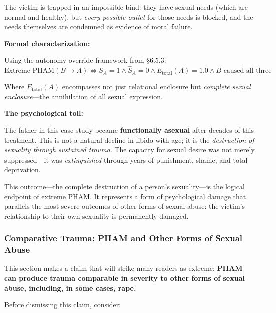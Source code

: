 \documentclass[12pt, letterpaper]{article}
\begin{document}
The victim is trapped in an impossible bind: they have sexual needs (which are normal and healthy), but \textit{every possible outlet} for those needs is blocked, and the needs themselves are condemned as evidence of moral failure.

\textbf{Formal characterization:}

Using the autonomy override framework from \S 6.5.3:
\[
\text{Extreme-PHAM}(B \rightarrow A) \iff S_A = 1 \land \hat{S}_A = 0 \land E_{\text{total}}(A) = 1.0 \land B \text{ caused all three}
\]

Where $E_{\text{total}}(A)$ encompasses not just relational enclosure but \textit{complete sexual enclosure}---the annihilation of all sexual expression.

\textbf{The psychological toll:}

The father in this case study became \textbf{functionally asexual} after decades of this treatment. This is not a natural decline in libido with age; it is the \textit{destruction of sexuality through sustained trauma}. The capacity for sexual desire was not merely suppressed---it was \textit{extinguished} through years of punishment, shame, and total deprivation.

This outcome---the complete destruction of a person's sexuality---is the logical endpoint of extreme PHAM. It represents a form of psychological damage that parallels the most severe outcomes of other forms of sexual abuse: the victim's relationship to their own sexuality is permanently damaged.

\subsubsection{Comparative Trauma: PHAM and Other Forms of Sexual Abuse}

This section makes a claim that will strike many readers as extreme: \textbf{PHAM can produce trauma comparable in severity to other forms of sexual abuse, including, in some cases, rape.}

Before dismissing this claim, consider:
\end{document}
